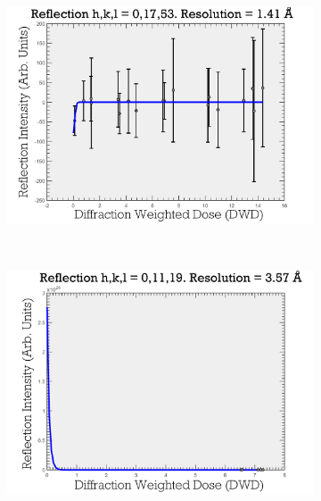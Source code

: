 \begin{figure}
        \centering
        \begin{subfigure}[b]{1\textwidth}
                \centering
                \includegraphics[width=\textwidth]{figures/zde/ReflectionPlot_h,k,l_0,17,53_fit_to_small_values.pdf}
                \caption{}
                \label{fig:Data overfitting to small values - Extrapolation method}
        \end{subfigure}
				\\
        \begin{subfigure}[b]{1\textwidth}
                \centering
                \includegraphics[width=\textwidth]{figures/zde/ReflectionPlot_h,k,l_0,11,19_zero_dose_too_high.pdf}
                \caption{}
                \label{fig:Unphysically high zero-dose intensity - Extrapolation method}

\end{subfigure}
\end{figure}

